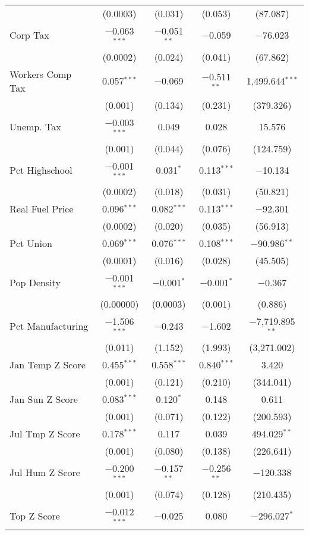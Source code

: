 \begin{table}[!htbp]
\begin{tabular}{@{\extracolsep{5pt}}lcccc}
  & (0.0003) & (0.031) & (0.053) & (87.087) \\ 
  Corp Tax & $-$0.063$^{***}$ & $-$0.051$^{**}$ & $-$0.059 & $-$76.023 \\ 
  & (0.0002) & (0.024) & (0.041) & (67.862) \\ 
  Workers Comp Tax & 0.057$^{***}$ & $-$0.069 & $-$0.511$^{**}$ & 1,499.644$^{***}$ \\ 
  & (0.001) & (0.134) & (0.231) & (379.326) \\ 
  Unemp. Tax & $-$0.003$^{***}$ & 0.049 & 0.028 & 15.576 \\ 
  & (0.001) & (0.044) & (0.076) & (124.759) \\ 
  Pct Highschool & $-$0.001$^{***}$ & 0.031$^{*}$ & 0.113$^{***}$ & $-$10.134 \\ 
  & (0.0002) & (0.018) & (0.031) & (50.821) \\ 
  Real Fuel Price & 0.096$^{***}$ & 0.082$^{***}$ & 0.113$^{***}$ & $-$92.301 \\ 
  & (0.0002) & (0.020) & (0.035) & (56.913) \\ 
  Pct Union & 0.069$^{***}$ & 0.076$^{***}$ & 0.108$^{***}$ & $-$90.986$^{**}$ \\ 
  & (0.0001) & (0.016) & (0.028) & (45.505) \\ 
  Pop Density & $-$0.001$^{***}$ & $-$0.001$^{*}$ & $-$0.001$^{*}$ & $-$0.367 \\ 
  & (0.00000) & (0.0003) & (0.001) & (0.886) \\ 
  Pct Manufacturing & $-$1.506$^{***}$ & $-$0.243 & $-$1.602 & $-$7,719.895$^{**}$ \\ 
  & (0.011) & (1.152) & (1.993) & (3,271.002) \\ 
  Jan Temp Z Score & 0.455$^{***}$ & 0.558$^{***}$ & 0.840$^{***}$ & 3.420 \\ 
  & (0.001) & (0.121) & (0.210) & (344.041) \\ 
  Jan Sun Z Score & 0.083$^{***}$ & 0.120$^{*}$ & 0.148 & 0.611 \\ 
  & (0.001) & (0.071) & (0.122) & (200.593) \\ 
  Jul Tmp Z Score & 0.178$^{***}$ & 0.117 & 0.039 & 494.029$^{**}$ \\ 
  & (0.001) & (0.080) & (0.138) & (226.641) \\ 
  Jul Hum Z Score & $-$0.200$^{***}$ & $-$0.157$^{**}$ & $-$0.256$^{**}$ & $-$120.338 \\ 
  & (0.001) & (0.074) & (0.128) & (210.435) \\ 
  Top Z Score & $-$0.012$^{***}$ & $-$0.025 & 0.080 & $-$296.027$^{*}$ \\ 

\end{tabular}
\end{table}

